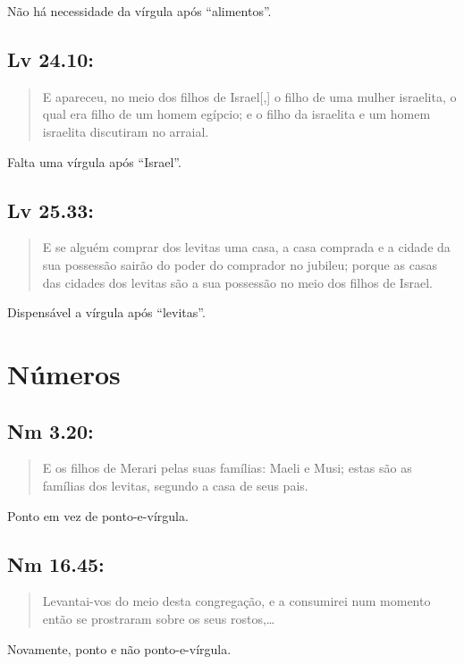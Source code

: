 Não há necessidade da vírgula após ``alimentos''.

\subsection{Lv 24.10:}
\begin{quote}
    \small
E apareceu, no meio dos filhos de Israel[,] o filho de uma mulher israelita, o qual era filho de um homem egípcio; e o filho da israelita e um homem israelita discutiram no arraial.
\end{quote}

Falta uma vírgula após ``Israel''.

\subsection{Lv 25.33:}
\begin{quote}
    \small
E se alguém comprar dos levitas\uwave{,} uma casa, a casa comprada e a cidade da sua possessão sairão do poder do comprador no jubileu; porque as casas das cidades dos levitas são a sua possessão no meio dos filhos de Israel.
\end{quote}

Dispensável a vírgula após ``levitas''.

\section{Números}
\subsection{Nm 3.20:}
\begin{quote}
    \small
E os filhos de Merari pelas suas famílias: Maeli e Musi\uline{;} estas são as famílias dos levitas, segundo a casa de seus pais.
\end{quote}

Ponto em vez de ponto-e-vírgula.


\subsection{Nm 16.45:}
\begin{quote}
    \small
Levantai-vos do meio desta congregação, e a consumirei num momento\uwave{;} então se prostraram sobre os seus rostos,\ldots
\end{quote}

Novamente, ponto e não ponto-e-vírgula.


